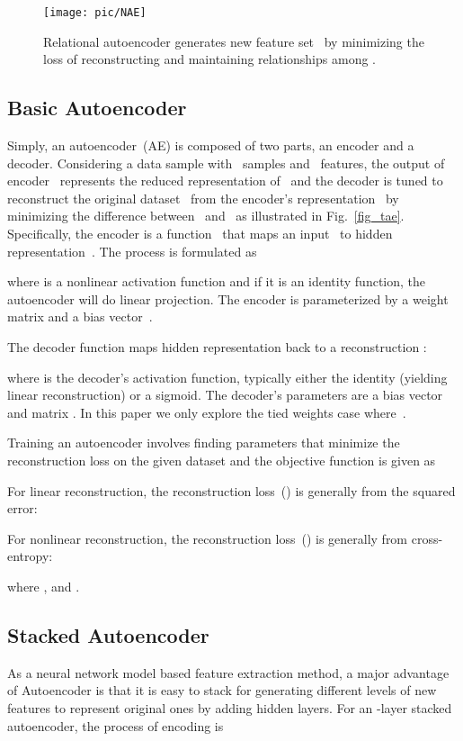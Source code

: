 \documentclass[conference]{IEEEtran}
\begin{document}
	\begin{figure}[!t]
		\centering
		\texttt{[image: pic/NAE]}
		\caption{Relational autoencoder generates new feature set~ by minimizing the loss of reconstructing  and maintaining relationships among .}
		\label{fig_nae}
	\end{figure}
	
	\subsection{Basic Autoencoder}
	Simply, an autoencoder~(AE) is composed of two parts, an encoder and a decoder. Considering a data sample  with~ samples and~ features, the output of encoder~ represents the reduced representation of~ and the decoder is tuned to reconstruct the original dataset~ from the encoder's representation~ by minimizing the difference between~ and~ as illustrated in Fig.~\ref{fig_tae}. Specifically, the encoder is a function~ that maps an input~ to hidden representation~. The process is formulated as
	
	where  is a nonlinear activation function and if it is an identity function, the autoencoder will do linear projection. The encoder is parameterized by a weight matrix  and a bias vector~.
	
	The decoder function  maps hidden representation  back to a reconstruction :
	
	where  is the decoder's activation function, typically either the identity (yielding linear reconstruction) or a sigmoid. The decoder's parameters are a bias vector  and matrix . In this paper we only explore the tied weights case where~.
	
	Training an autoencoder involves finding parameters  that minimize the reconstruction loss on the given dataset  and the objective function is given as
	
	For linear reconstruction, the reconstruction loss~() is generally from the squared error:
	
	For nonlinear reconstruction, the reconstruction loss~() is generally from cross-entropy:
	
	where ,  and .
	
	\subsection{Stacked Autoencoder}
	As a neural network model based feature extraction method, a major advantage of Autoencoder is that it is easy to stack for generating different levels of new features to represent original ones by adding hidden layers. For an -layer stacked autoencoder, the process of encoding is
	
\end{document}
